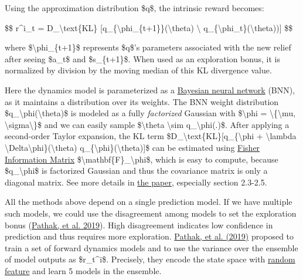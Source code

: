 Using the approximation distribution \$q\$, the intrinsic reward becomes:

\$\$ r\^{}i\_t = D\_\textbackslash text\{KL\} {[}q\_\{\textbackslash phi\_\{t+1\}\}(\textbackslash theta) \textbackslash\textbar{} q\_\{\textbackslash phi\_t\}(\textbackslash theta)){]} \$\$

where \$\textbackslash phi\_\{t+1\}\$ represents \$q\$'s parameters associated with the new relief after seeing \$a\_t\$ and \$s\_\{t+1\}\$. When used as an exploration bonus, it is normalized by division by the moving median of this KL divergence value.

Here the dynamics model is parameterized as a \href{https://link.springer.com/book/10.1007/978-1-4612-0745-0}{Bayesian neural network} (BNN), as it maintains a distribution over its weights. The BNN weight distribution \$q\_\textbackslash phi(\textbackslash theta)\$ is modeled as a fully \emph{factorized} Gaussian with \$\textbackslash phi = \textbackslash\{\textbackslash mu, \textbackslash sigma\textbackslash\}\$ and we can easily sample \$\textbackslash theta \textbackslash sim q\_\textbackslash phi(.)\$. After applying a second-order Taylor expansion, the KL term \$D\_\textbackslash text\{KL\}{[}q\_\{\textbackslash phi + \textbackslash lambda \textbackslash Delta\textbackslash phi\}(\textbackslash theta) \textbar{} q\_\{\textbackslash phi\}(\textbackslash theta){]}\$ can be estimated using \href{https://lilianweng.github.io/posts/2019-09-05-evolution-strategies/\#estimation-using-fisher-information-matrix}{Fisher Information Matrix} \$\textbackslash mathbf\{F\}\_\textbackslash phi\$, which is easy to compute, because \$q\_\textbackslash phi\$ is factorized Gaussian and thus the covariance matrix is only a diagonal matrix. See more details in \href{https://arxiv.org/abs/1605.09674}{the paper}, especially section 2.3-2.5.

\label{exploration-via-disagreement}{}All the methods above depend on a single prediction model. If we have multiple such models, we could use the disagreement among models to set the exploration bonus (\href{https://arxiv.org/abs/1906.04161}{Pathak, et al. 2019}). High disagreement indicates low confidence in prediction and thus requires more exploration. \href{https://arxiv.org/abs/1906.04161}{Pathak, et al. (2019)} proposed to train a set of forward dynamics models and to use the variance over the ensemble of model outputs as \$r\_t\^{}i\$. Precisely, they encode the state space with \hyperref[random-feature]{random feature} and learn 5 models in the ensemble.

